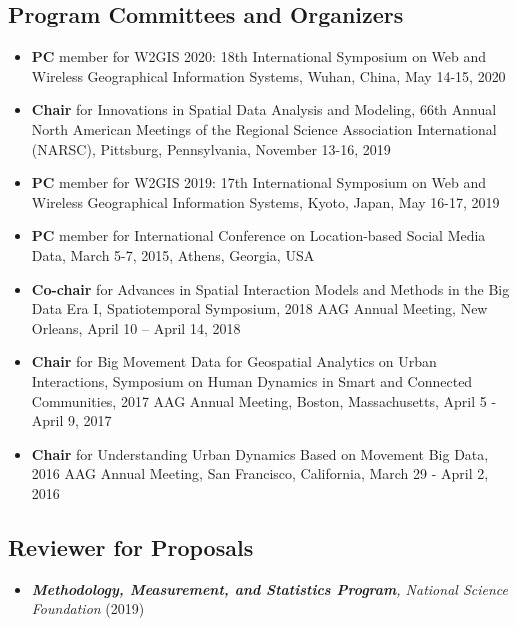 \documentclass[11pt, a4paper]{article}
\begin{document}
\subsection*{Program Committees and Organizers}
\begin{itemize}
\item{\textbf{PC} member for W2GIS 2020: 18th International Symposium on Web and Wireless Geographical Information Systems, Wuhan, China, May 14-15, 2020}
\item{\textbf{Chair} for Innovations in Spatial Data Analysis and Modeling, 66th Annual North American Meetings of the Regional Science Association International (NARSC), Pittsburg, Pennsylvania, November 13-16, 2019}
\item{\textbf{PC} member for W2GIS 2019: 17th International Symposium on Web and Wireless Geographical Information Systems, Kyoto, Japan, May 16-17, 2019}
\item{\textbf{PC} member for International Conference on Location-based Social Media Data, March 5-7, 2015, Athens, Georgia, USA}
\item{\textbf{Co-chair} for Advances in Spatial Interaction Models and Methods in the Big Data Era I, Spatiotemporal Symposium, 2018 AAG Annual Meeting, New Orleans, April 10 – April 14, 2018}
\item{\textbf{Chair} for Big Movement Data for Geospatial Analytics on Urban Interactions, Symposium on Human Dynamics in Smart and Connected Communities, 2017 AAG Annual Meeting, Boston, Massachusetts, April 5 - April 9, 2017}
\item{\textbf{Chair} for Understanding Urban Dynamics Based on Movement Big Data, 2016 AAG Annual Meeting, San Francisco, California, March 29 - April 2, 2016}
\end{itemize}
\subsection*{Reviewer for Proposals}
\begin{itemize}
  \setlength\itemsep{0em}
  \item \emph{\textbf{Methodology, Measurement, and Statistics Program}, National Science Foundation} (2019)  
\end{itemize} 
\end{document}
